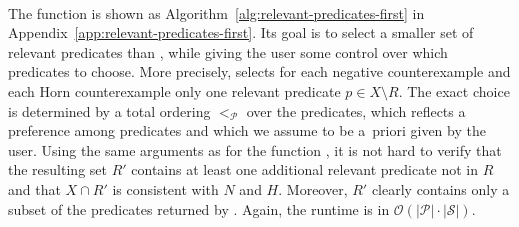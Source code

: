 \paragraph*{\protect{\RelevantPredicatesFirst}}
The function \RelevantPredicatesFirst is shown as Algorithm~\ref{alg:relevant-predicates-first} in Appendix~\ref{app:relevant-predicates-first}.
Its goal is to select a smaller set of relevant predicates than \RelevantPredicatesMax, while giving the user some control over which predicates to choose.
More precisely, \RelevantPredicatesFirst selects for each negative counterexample and each Horn counterexample only one relevant predicate $p \in X \setminus R$.
The exact choice is determined by a total ordering $<_\mathcal P$ over the predicates, which reflects a preference among predicates and which we assume to be a~priori given by the user.
Using the same arguments as for the function \RelevantPredicatesMax, it is not hard to verify that the resulting set $R'$ contains at least one additional relevant predicate not in $R$ and that $X \cap R'$ is consistent with $N$ and $H$.
Moreover, $R'$ clearly contains only a subset of the predicates returned by \RelevantPredicatesMax.
Again, the runtime is in $\mathcal O(|\mathcal P| \cdot |\mathcal S|)$.


